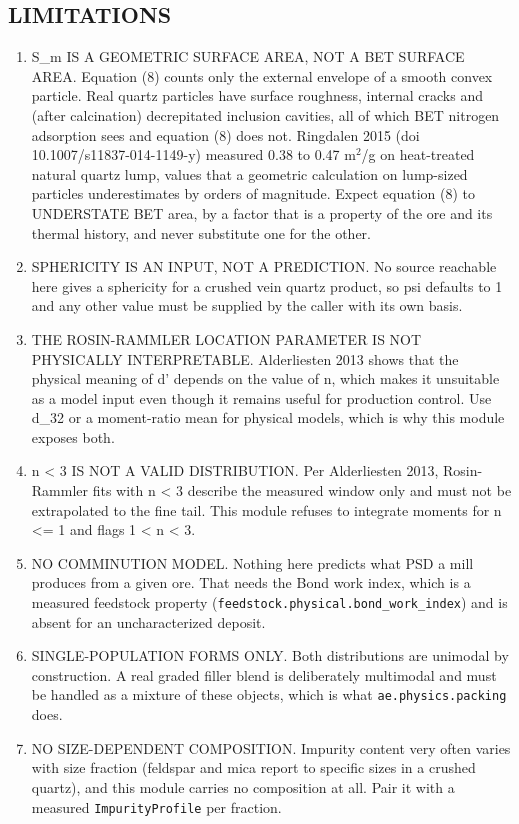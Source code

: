 \documentclass[10pt,a4paper,twoside]{report}
\begin{document}
\subsection*{LIMITATIONS}

\begin{enumerate}[leftmargin=*,label=\arabic*.]
\item S\_m IS A GEOMETRIC SURFACE AREA, NOT A BET SURFACE AREA. Equation (8) counts only the external envelope of a smooth convex particle. Real quartz particles have surface roughness, internal cracks and (after calcination) decrepitated inclusion cavities, all of which BET nitrogen adsorption sees and equation (8) does not. Ringdalen 2015 (doi 10.1007/s11837-014-1149-y) measured 0.38 to 0.47 m$^{2}$/g on heat-treated natural quartz lump, values that a geometric calculation on lump-sized particles underestimates by orders of magnitude. Expect equation (8) to UNDERSTATE BET area, by a factor that is a property of the ore and its thermal history, and never substitute one for the other.
\item SPHERICITY IS AN INPUT, NOT A PREDICTION. No source reachable here gives a sphericity for a crushed vein quartz product, so psi defaults to 1 and any other value must be supplied by the caller with its own basis.
\item THE ROSIN-RAMMLER LOCATION PARAMETER IS NOT PHYSICALLY INTERPRETABLE. Alderliesten 2013 shows that the physical meaning of d' depends on the value of n, which makes it unsuitable as a model input even though it remains useful for production control. Use d\_32 or a moment-ratio mean for physical models, which is why this module exposes both.
\item n < 3 IS NOT A VALID DISTRIBUTION. Per Alderliesten 2013, Rosin-Rammler fits with n < 3 describe the measured window only and must not be extrapolated to the fine tail. This module refuses to integrate moments for n <= 1 and flags 1 < n < 3.
\item NO COMMINUTION MODEL. Nothing here predicts what PSD a mill produces from a given ore. That needs the Bond work index, which is a measured feedstock property (\texttt{feedstock.physical.bond\_work\_index}) and is absent for an uncharacterized deposit.
\item SINGLE-POPULATION FORMS ONLY. Both distributions are unimodal by construction. A real graded filler blend is deliberately multimodal and must be handled as a mixture of these objects, which is what \texttt{ae.physics.packing} does.
\item NO SIZE-DEPENDENT COMPOSITION. Impurity content very often varies with size fraction (feldspar and mica report to specific sizes in a crushed quartz), and this module carries no composition at all. Pair it with a measured \texttt{ImpurityProfile} per fraction.
\end{enumerate}
\end{document}
